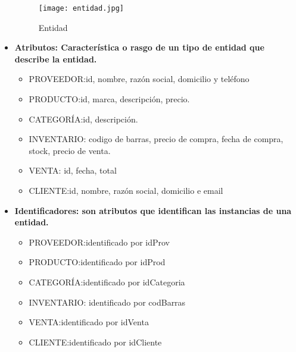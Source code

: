 \documentclass[30pt,fleqn]{article}
\begin{document}
\begin{itemize}
\begin{figure}[h]
    \centering
    \texttt{[image: entidad.jpg]}
    \caption{Entidad}
    \label{fig:Entidad}
\end{figure}

\vspace{10mm} %
\vspace{10mm} %
\item\textbf{Atributos: Característica o rasgo de un tipo de entidad que describe la entidad.}
\vspace{10mm} %

\begin{itemize}
\item PROVEEDOR:id, nombre, razón social, domicilio y teléfono
\vspace{10mm} %
\item PRODUCTO:id, marca, descripción, precio.
\vspace{10mm} %
\item CATEGORÍA:id, descripción.
\vspace{10mm} %
\item INVENTARIO: codigo de barras, precio de compra, fecha de compra, stock, precio de venta.
\vspace{10mm} %
\item VENTA: id, fecha, total
\vspace{10mm} %
\item CLIENTE:id, nombre, razón social, domicilio e email
\end{itemize}
\vspace{10mm} %
\vspace{10mm} %

\item \textbf{Identificadores: son atributos que identifican las instancias de una entidad. }
\vspace{10mm} %

\begin{itemize}

\item PROVEEDOR:identificado por idProv
\vspace{10mm} %
\item PRODUCTO:identificado por idProd
\vspace{10mm} %
\item CATEGORÍA:identificado por idCategoria
\vspace{10mm} %
\item INVENTARIO: identificado por codBarras
\vspace{10mm} %
\item VENTA:identificado por  idVenta
\vspace{10mm} %
\item CLIENTE:identificado por idCliente
\vspace{10mm} %


\end{itemize}
\end{itemize}
\end{document}
